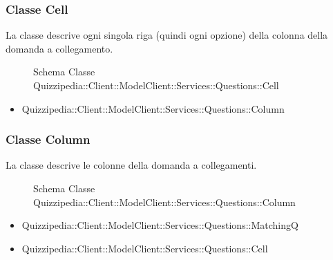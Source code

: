 \subsubsection{Classe Cell}
La classe descrive ogni singola riga (quindi ogni opzione) della colonna della domanda a collegamento.
\begin{figure}[H]
\centering
\noindent{}
\caption[Schema Classe Cell]{Schema Classe Quizzipedia::Client::ModelClient::Services::Questions::Cell}
\end{figure}
\begin{itemize}
\item Quizzipedia::Client::ModelClient::Services::Questions::Column
\end{itemize}
\subsubsection{Classe Column}
La classe descrive le colonne della domanda a collegamenti.
\begin{figure}[H]
\centering
\noindent{}
\caption[Schema Classe Column]{Schema Classe Quizzipedia::Client::ModelClient::Services::Questions::Column}
\end{figure}
\begin{itemize}
\item Quizzipedia::Client::ModelClient::Services::Questions::MatchingQ
\end{itemize}
\begin{itemize}
\item Quizzipedia::Client::ModelClient::Services::Questions::Cell
\end{itemize}
